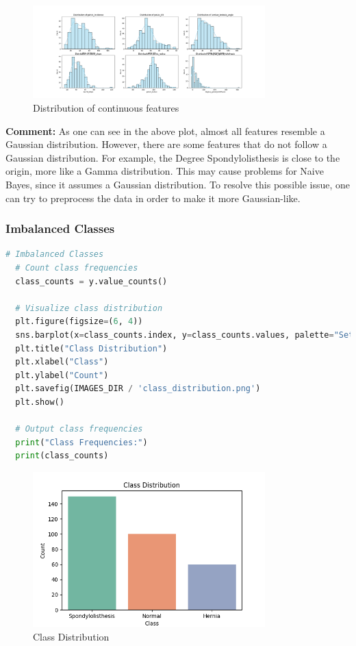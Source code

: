 \documentclass{article}
\begin{document}
\begin{figure}[H]
  \centering
  \includegraphics[width=0.8\textwidth]{images/continuous_features.png}
  \caption{Distribution of continuous features}
  \label{fig:continuous_features}
\end{figure}

\textbf{Comment:}
As one can see in the above plot, almost all features resemble a Gaussian distribution. However, there are some features that do not follow a Gaussian distribution. For example, the Degree Spondylolisthesis is close to the origin, more like a Gamma distribution. This may cause problems for Naive Bayes, since it assumes a Gaussian distribution. To resolve this possible issue, one can try to preprocess the data in order to make it more Gaussian-like.

\subsubsection*{Imbalanced Classes}

\begin{lstlisting}[language=Python]
  # Imbalanced Classes
  # Count class frequencies
  class_counts = y.value_counts()

  # Visualize class distribution
  plt.figure(figsize=(6, 4))
  sns.barplot(x=class_counts.index, y=class_counts.values, palette="Set2")
  plt.title("Class Distribution")
  plt.xlabel("Class")
  plt.ylabel("Count")
  plt.savefig(IMAGES_DIR / 'class_distribution.png')
  plt.show()

  # Output class frequencies
  print("Class Frequencies:")
  print(class_counts)
\end{lstlisting}

\begin{figure}[H]
  \centering
  \includegraphics[width=0.8\textwidth]{images/class_distribution.png}
  \caption{Class Distribution}
  \label{fig:class_distribution}
\end{figure}
\end{document}
